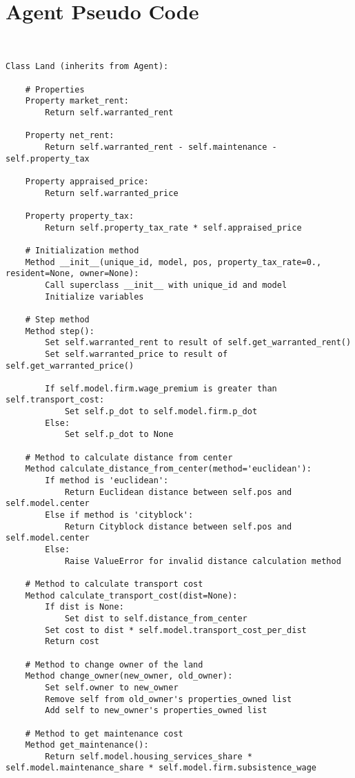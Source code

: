 \section{Agent Pseudo Code}
{\small\begin{verbatim} 


Class Land (inherits from Agent):

    # Properties
    Property market_rent:
        Return self.warranted_rent

    Property net_rent:
        Return self.warranted_rent - self.maintenance - self.property_tax

    Property appraised_price:
        Return self.warranted_price

    Property property_tax:
        Return self.property_tax_rate * self.appraised_price

    # Initialization method
    Method __init__(unique_id, model, pos, property_tax_rate=0., resident=None, owner=None):
        Call superclass __init__ with unique_id and model
        Initialize variables

    # Step method
    Method step():
        Set self.warranted_rent to result of self.get_warranted_rent()
        Set self.warranted_price to result of self.get_warranted_price()
        
        If self.model.firm.wage_premium is greater than self.transport_cost:
            Set self.p_dot to self.model.firm.p_dot
        Else:
            Set self.p_dot to None

    # Method to calculate distance from center
    Method calculate_distance_from_center(method='euclidean'):
        If method is 'euclidean':
            Return Euclidean distance between self.pos and self.model.center
        Else if method is 'cityblock':
            Return Cityblock distance between self.pos and self.model.center
        Else:
            Raise ValueError for invalid distance calculation method

    # Method to calculate transport cost
    Method calculate_transport_cost(dist=None):
        If dist is None:
            Set dist to self.distance_from_center
        Set cost to dist * self.model.transport_cost_per_dist
        Return cost

    # Method to change owner of the land
    Method change_owner(new_owner, old_owner):
        Set self.owner to new_owner
        Remove self from old_owner's properties_owned list
        Add self to new_owner's properties_owned list

    # Method to get maintenance cost
    Method get_maintenance():
        Return self.model.housing_services_share * self.model.maintenance_share * self.model.firm.subsistence_wage


\end{verbatim}}
